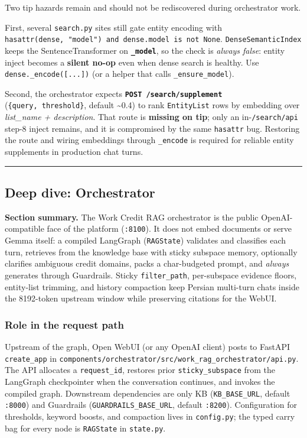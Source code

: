 \documentclass[
  11pt,
]{article}
\begin{document}
Two tip hazards remain and should not be rediscovered during
orchestrator work.

First, several \texttt{search.py} sites still gate entity encoding with
\texttt{hasattr(dense,\ "model")\ and\ dense.model\ is\ not\ None}.
\texttt{DenseSemanticIndex} keeps the SentenceTransformer on
\textbf{\texttt{\_model}}, so the check is \emph{always false}: entity
inject becomes a \textbf{silent no-op} even when dense search is
healthy. Use \texttt{dense.\_encode({[}...{]})} (or a helper that calls
\texttt{\_ensure\_model}).

Second, the orchestrator expects
\textbf{\texttt{POST\ /search/supplement}}
(\texttt{\{query,\ threshold\}}, default \textasciitilde0.4) to rank
\texttt{EntityList} rows by embedding over \emph{list\_name +
description}. That route is \textbf{missing on tip}; only an
in-\texttt{/search/api} step-8 inject remains, and it is compromised by
the same \texttt{hasattr} bug. Restoring the route and wiring embeddings
through \texttt{\_encode} is required for reliable entity supplements in
production chat turns.

\begin{center}\rule{0.5\linewidth}{0.5pt}\end{center}

\subsection{Deep dive: Orchestrator}\label{deep-dive-orchestrator}

\textbf{Section summary.} The Work Credit RAG orchestrator is the public
OpenAI-compatible face of the platform (\texttt{:8100}). It does not
embed documents or serve Gemma itself: a compiled LangGraph
(\texttt{RAGState}) validates and classifies each turn, retrieves from
the knowledge base with sticky subspace memory, optionally clarifies
ambiguous credit domains, packs a char-budgeted prompt, and
\emph{always} generates through Guardrails. Sticky
\texttt{filter\_path}, per-subspace evidence floors, entity-list
trimming, and history compaction keep Persian multi-turn chats inside
the 8192-token upstream window while preserving citations for the WebUI.

\subsubsection{Role in the request path}\label{role-in-the-request-path}

Upstream of the graph, Open WebUI (or any OpenAI client) posts to
FastAPI \texttt{create\_app} in
\texttt{components/orchestrator/src/work\_rag\_orchestrator/api.py}. The
API allocates a \texttt{request\_id}, restores prior
\texttt{sticky\_subspace} from the LangGraph checkpointer when the
conversation continues, and invokes the compiled graph. Downstream
dependencies are only KB (\texttt{KB\_BASE\_URL}, default
\texttt{:8000}) and Guardrails (\texttt{GUARDRAILS\_BASE\_URL}, default
\texttt{:8200}). Configuration for thresholds, keyword boosts, and
compaction lives in \texttt{config.py}; the typed carry bag for every
node is \texttt{RAGState} in \texttt{state.py}.
\end{document}

